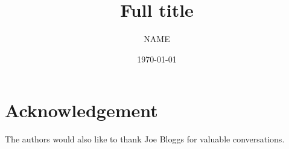 \documentclass[11pt,reqno,oneside,a4paper]{article}
\author{NAME}
\title{Full title}
\date{\today}
\begin{document}
\maketitle
\thispagestyle{fancy}







\section*{Acknowledgement}

\AckYNCSRP{\theauthor}
The authors would also like to thank Joe Bloggs for valuable conversations.


{\small}
\end{document}
